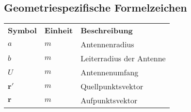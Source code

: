 \subsection*{Geometriespezifische Formelzeichen}


\FloatBarrier
\begin{longtable}[l]{p{70pt} p{80pt} p{200pt}}
 \textbf{Symbol}	& \textbf{Einheit} & \textbf{Beschreibung} \\
 $a$	& $m$	& Antennenradius\\
 $b$	& $m$	& Leiterradius der Antenne\\
 $U$	& $m$	& Antennenumfang\\
 $\mathbf{r'}$	& $m$	& Quellpunktsvektor\\
 $\mathbf{r}$	& $m$	& Aufpunktsvektor
\end{longtable}
\FloatBarrier
\newpage